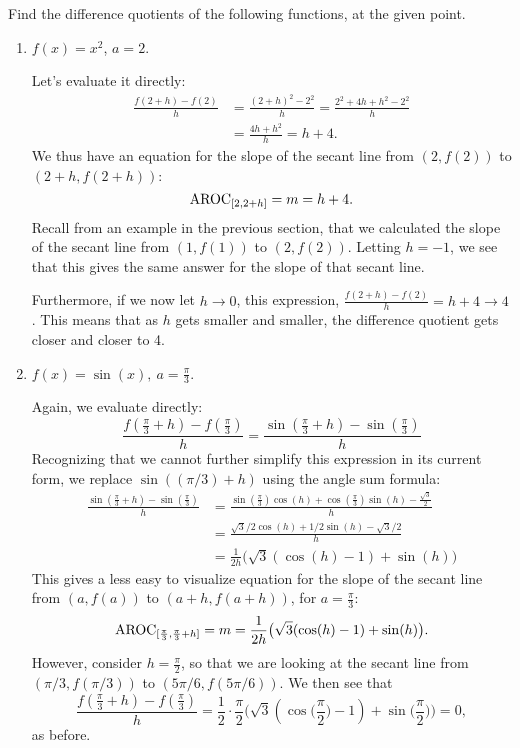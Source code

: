 \documentclass{ximera}
\begin{document}
\begin{example}
  Find the difference quotients of the following functions, at the given point. 
  \begin{enumerate}[label=\alph*.]
  \item $f(x)=x^2$, $a=2$.

    \begin{explanation}
      Let's evaluate it directly:
      \begin{align*}
        \frac{f(2+h)-f(2)}{h} &= \frac{(2+h)^2-2^2}{h} = \frac{2^2+4h+h^2-2^2}{h} \\ &= \frac{4h+h^2}{h} = h+4.
      \end{align*}
      We thus have an equation for the slope of the secant line from $(2,f(2))$ to $(2+h,f(2+h))$: 
      $$\mathrm{AROC}_{[2,2+h]}= m = h+4.$$
      Recall from an example in the previous section, that we calculated the slope of the secant line from $(1,f(1))$ to $(2,f(2))$. Letting $h=-1$, we see that this gives the same answer for the slope of that secant line.
      
      Furthermore, if we now let $h \rightarrow 0$, this expression, $\frac{f(2+h)-f(2)}{h} = h+ 4 \rightarrow 4$. This means that as $h$ gets smaller and smaller, the difference quotient gets closer and closer to 4. 
    \end{explanation}
    
  \item $f(x) = \sin (x), \ a =\frac{\pi}{3}$.\\
  \begin{explanation}
  Again, we evaluate directly:
  \begin{equation*}
   \frac{f(\frac{\pi}{3} + h) - f(\frac{\pi}{3})}{h} = \frac{\sin(\frac{\pi}{3} +h) - \sin (\frac{\pi}{3})}{h}
  \end{equation*}
  Recognizing that we cannot further simplify this expression in its current form, we replace $\sin((\pi/3) +h)$ using the angle sum formula:
  \begin{align*}
  \frac{\sin(\frac{\pi}{3} +h) - \sin (\frac{\pi}{3})}{h} 
  &= \frac{\sin(\frac{\pi}{3})\cos (h) + \cos(\frac{\pi}{3}) \sin( h) - \frac{\sqrt{3}}{2}}{h} \\
  & = \frac{\sqrt{3}/2\cos(h) + 1/2 \sin(h) - \sqrt{3}/2}{h}\\
  &= \frac{1}{2h}\big(\sqrt{3}(\cos (h) -1) + \sin( h)\big)
  \end{align*}
  This gives a less easy to visualize equation for the slope of the secant line from $(a,f(a))$ to $(a+h,f(a+h))$, for $a=\frac{\pi}{3}$: 
  $$\mathrm{AROC}_{[\frac{\pi}{3},\frac{\pi}{3}+h]}= m =\frac{1}{2h}\big(\sqrt{3}(\cos (h) -1) + \sin( h)\big).$$ 
  However, consider $h=\frac{\pi}{2}$, so that we are looking at the secant line from $(\pi/3, f(\pi/3))$ to $(5\pi/6, f(5\pi/6))$. We then see that 
  $$ \frac{f(\frac{\pi}{3} + h) - f(\frac{\pi}{3})}{h} = \frac{1}{2} \cdot \frac{\pi}{2}\big(\sqrt{3}(\cos\Big(\frac{\pi}{2}\Big) -1)+ \sin\Big(\frac{\pi}{2}\Big) \big)= 0,$$
 as before.
 

\end{explanation}
\end{enumerate}
\end{example}
\end{document}

